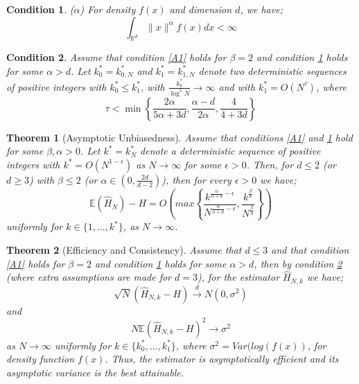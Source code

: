 \documentclass{report}
\newtheorem{theorem}{Theorem}
\newtheorem{remark}{Condition}
\begin{document}
\begin{remark} ($\alpha$) \label{A2}
For density $f(x)$ and dimension $d$, we have;
\begin{equation}
\int_{\mathbb{R}^{d}} \| x \|^{\alpha} f(x) dx < \infty \nonumber
\end{equation}
\end{remark}

\begin{remark} \label{A3}
Assume that condition \ref{A1} holds for $\beta = 2$ and condition \ref{A2} holds for some $\alpha > d$. Let $k_{0}^{*} = k_{0, N}^{*}$ and $k_{1}^{*} = k_{1, N}^{*}$ denote two deterministic sequences of positive integers with $k_{0}^{*} \leq k_{1}^{*}$, with $\frac{k_{0}^{*}}{\log^{5}{N}} \to \infty$ and with $k_{1}^{*} = O(N^{\tau})$, where
\begin{equation}
\tau < \min \left\{ \frac{2 \alpha}{5 \alpha + 3d} , \frac{\alpha - d}{2 \alpha} , \frac{4}{4 + 3d} \right\} \nonumber
\end{equation}
\end{remark}


\begin{theorem}[Asymptotic Unbiasedness] \label{unbias}
Assume that conditions \ref{A1} and \ref{A2} hold for some $\beta, \alpha > 0$. Let  $k^{*} = k_{N}^{*}$ denote a deterministic sequence of positive integers with $k^{*} = O(N^{1-\epsilon})$ as $N \to \infty$  for some $\epsilon > 0$. Then, for $d \leq 2$ (or $d \geq 3$) with $\beta \leq 2$ (or $\alpha \in (0, \frac{2d}{d-2})$), then for every $\epsilon >0$ we have;
\begin{equation} \label{unbias_equation}
\mathbb{E} ( \hat{H}_{N} ) - H = O \left( max \left\{ \frac{k^{\frac{\alpha}{\alpha + d} - \epsilon}}{N^{\frac{\alpha}{\alpha + d} - \epsilon}}, \frac{k^{\frac{\beta}{d}}}{N^{\frac{\beta}{d}}} \right\} \right)
\end{equation}
uniformly for $k \in \{1, ..., k^{*}\}$, as $N \to \infty$.
\end{theorem}


\begin{theorem}[Efficiency and Consistency] \label{efficient}
Assume that $d \leq 3$ and that condition \ref{A1} holds for $\beta = 2$ and condition \ref{A2} holds for some $\alpha > d$, then by condition \ref{A3} (where extra assumptions are made for $d=3$), for the estimator $\hat{H}_{N, k}$ we have;
\begin{equation} \label{efficiency_equation}
\sqrt{N}(\hat{H}_{N, k} - H) \xrightarrow{d} N(0, \sigma^2)
\end{equation}
and 
\begin{equation} \label{consistency_equation}
N \mathbb{E}{(\hat{H}_{N, k} - H)^2} \xrightarrow{} \sigma^2
\end{equation}
as $N \to \infty$ uniformly for $k \in \{ k_{0}^{*}, ...,  k_{1}^{*} \}$, where $\sigma^2 = Var(log(f(x))$, for density function $f(x)$. Thus, the estimator is asymptotically efficient and its asymptotic variance is the best attainable.
\end{theorem}
\end{document}
